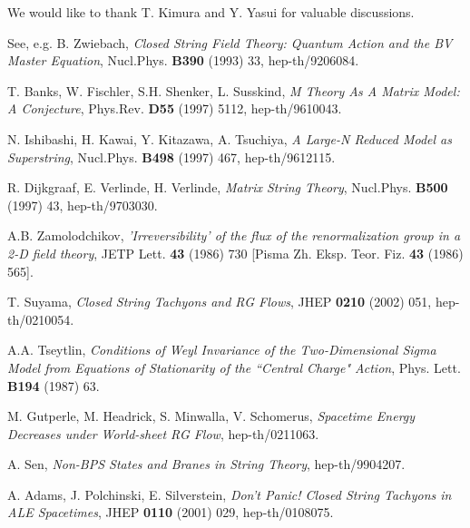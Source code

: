 \documentclass[a4paper,a4paper]{article}
\begin{document}
\vspace{5mm}

We would like to thank T. Kimura and Y. Yasui for valuable discussions. 


















\newpage


\begin{thebibliography}{99}

See, e.g. 
B. Zwiebach, 
{\it Closed String Field Theory: Quantum Action and the BV Master Equation}, 
Nucl.Phys. {\bf B390} (1993) 33, hep-th/9206084. 

T. Banks, W. Fischler, S.H. Shenker, L. Susskind, 
{\it M Theory As A Matrix Model: A Conjecture}, 
Phys.Rev. {\bf D55} (1997) 5112, hep-th/9610043. 

N. Ishibashi, H. Kawai, Y. Kitazawa, A. Tsuchiya, 
{\it A Large-N Reduced Model as Superstring}, 
Nucl.Phys. {\bf B498} (1997) 467, hep-th/9612115. 

R. Dijkgraaf, E. Verlinde, H. Verlinde, 
{\it Matrix String Theory}, 
Nucl.Phys. {\bf B500} (1997) 43, hep-th/9703030. 

A.B. Zamolodchikov, 
{\it 'Irreversibility' of the flux of the renormalization group in a 2-D field theory}, 
JETP Lett. {\bf 43} (1986) 730 [Pisma Zh. Eksp. Teor. Fiz. {\bf 43} (1986) 565]. 

T. Suyama, 
{\it Closed String Tachyons and RG Flows}, 
JHEP {\bf 0210} (2002) 051, hep-th/0210054. 

A.A. Tseytlin, 
{\it Conditions of Weyl Invariance of the Two-Dimensional Sigma Model from Equations of Stationarity of the 
``Central Charge" Action}, 
Phys. Lett. {\bf B194} (1987) 63. 

M. Gutperle, M. Headrick, S. Minwalla, V. Schomerus, 
{\it Spacetime Energy Decreases under World-sheet RG Flow}, 
hep-th/0211063. 

A. Sen, 
{\it Non-BPS States and Branes in String Theory}, 
hep-th/9904207. 

A. Adams, J. Polchinski, E. Silverstein, 
{\it Don't Panic! Closed String Tachyons in ALE Spacetimes}, 
JHEP {\bf 0110} (2001) 029, hep-th/0108075. 


\end{thebibliography}
\end{document}
